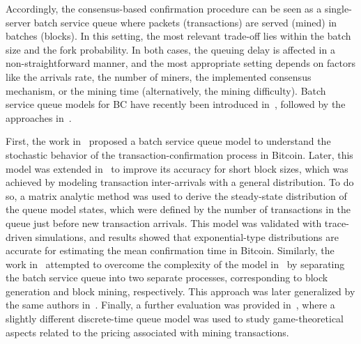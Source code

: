 \documentclass[conference]{IEEEtran}
\theoremstyle{definition}
\begin{document}
Accordingly, the consensus-based confirmation procedure can be seen as a single-server batch service queue where packets (transactions) are served (mined) in batches (blocks). In this setting, the most relevant trade-off lies within the batch size and the fork probability. In both cases, the queuing delay is affected in a non-straightforward manner, and the most appropriate setting depends on factors like the arrivals rate, the number of miners, the implemented consensus mechanism, or the mining time (alternatively, the mining difficulty). Batch service queue models for BC have recently been introduced in~\cite{kawase2017transaction}, followed by the approaches in~\cite{kawase2018batch, li2018blockchain, geissler2019discrete, li2019markov, qi2020nash}. 

First, the work in~\cite{kawase2017transaction} proposed a batch service queue model to understand the stochastic behavior of the transaction-confirmation process in Bitcoin. Later, this model was extended in~\cite{kawase2018batch} to improve its accuracy for short block sizes, which was achieved by modeling transaction inter-arrivals with a general distribution. To do so, a matrix analytic method was used to derive the steady-state distribution of the queue model states, which were defined by the number of transactions in the queue just before new transaction arrivals. This model was validated with trace-driven simulations, and results showed that exponential-type distributions are accurate for estimating the mean confirmation time in Bitcoin. Similarly, the work in~\cite{li2018blockchain} attempted to overcome the complexity of the model in~\cite{kawase2017transaction, kawase2018batch} by separating the batch service queue into two separate processes, corresponding to block generation and block mining, respectively. This approach was later generalized by the same authors in~\cite{li2019markov}. Finally, a further evaluation was provided in~\cite{qi2020nash}, where a slightly different discrete-time queue model was used to study game-theoretical aspects related to the pricing associated with mining transactions.
\end{document}
